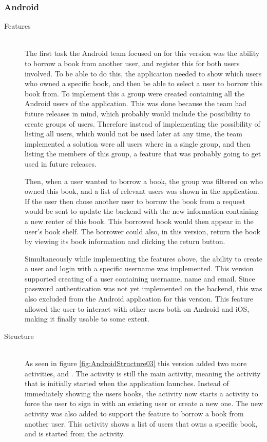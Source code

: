 \subsubsection{Android}
\begin{description}
    \item[Features] \hfill\\
The first task the Android team focused on for this version was the ability to borrow a book from another user, and register this for both users involved. To be able to do this, the application needed to show which users who owned a specific book, and then be able to select a user to borrow this book from. To implement this a group were created containing all the Android users of the application. This was done because the team had future releases in mind, which probably would include the possibility to create groups of users. Therefore instead of implementing the possibility of listing all users, which would not be used later at any time, the team implemented a solution were all users where in a single group, and then listing the members of this group, a feature that was probably going to get used in future releases. 

Then, when a user wanted to borrow a book, the group was filtered on who owned this book, and a list of relevant users was shown in the application. If the user then chose another user to borrow the book from a request would be sent to update the \gls{backend} with the new information containing a new renter of this book. This borrowed book would then appear in the user's book shelf. The borrower could also, in this version, return the book by viewing its book information and clicking the return button. 

Simultaneously while implementing the features above, the ability to create a user and login with a specific username was implemented. This version supported creating of a user containing username, name and email. Since password authentication was not yet implemented on the \gls{backend}, this was also excluded from the Android application for this version. This feature allowed the user to interact with other users both on Android and iOS, making it finally usable to some extent. 

    \item[Structure] \hfill\\
As seen in figure \ref{fig:AndroidStructure03} this version added two more activities,  and . The  activity is still the main activity, meaning the activity that is initially started when the application launches. Instead of immediately showing the users books, the  activity now starts a  activity to force the user to sign in with an existing user or create a new one. The new  activity was also added to support the feature to borrow a book from another user. This activity shows a list of users that owns a specific book, and is started from the  activity. 


\end{description}

